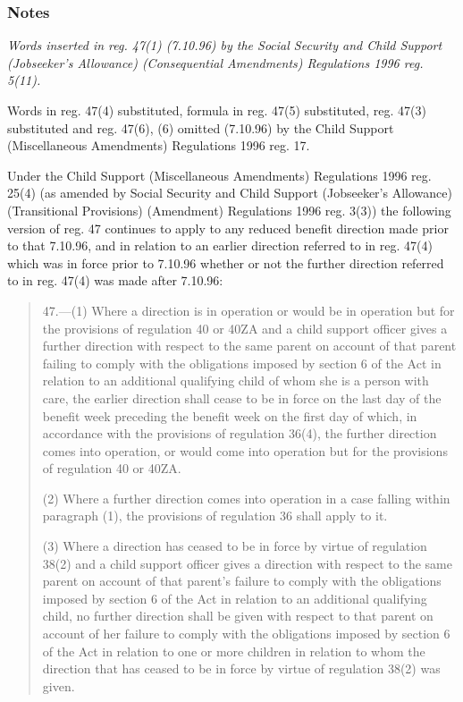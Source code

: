 \documentclass[a4paper]{article}
\newcommand\amendment[1]{\subsubsection*{Notes}{\itshape\frenchspacing\footnotesize #1 \par}}
\begin{document}
\amendment{
Words inserted in reg. 47(1) (7.10.96) by the Social Security and Child Support (Jobseeker's Allowance) (Consequential Amendments) Regulations 1996 reg. 5(11).

Words in reg. 47(4) substituted, formula in reg. 47(5) substituted, reg. 47(3) substituted and reg. 47(6), (6) omitted (7.10.96) by the Child Support (Miscellaneous Amendments) Regulations 1996 reg. 17.

Under the Child Support (Miscellaneous Amendments) Regulations 1996 reg. 25(4) (as amended by Social Security and Child Support (Jobseeker's Allowance) (Transitional Provisions) (Amendment) Regulations 1996 reg. 3(3)) the following version of reg. 47 continues to apply to any reduced benefit direction made prior to that 7.10.96, and in relation to an earlier direction referred to in reg. 47(4) which was in force prior to 7.10.96 whether or not the further direction referred to in reg. 47(4) was made after 7.10.96:

\begin{quotation}
47.—(1) Where a direction is in operation or would be in operation but for the provisions of regulation 40 
or 40ZA  %
and a child support officer gives a further direction with respect to the same parent on account of that parent failing to comply with the obligations imposed by section 6 of the Act in relation to an additional qualifying child of whom she is a person with care, the earlier direction shall cease to be in force on the last day of the benefit week preceding the benefit week on the first day of which, in accordance with the provisions of regulation 36(4), the further direction comes into operation, or would come into operation but for the provisions of regulation 40
or 40ZA.  %

(2) Where a further direction comes into operation in a case falling within paragraph (1), the provisions of regulation 36 shall apply to it.

(3) Where a direction has ceased to be in force by virtue of regulation 38(2) and a child support officer gives a direction with respect to the same parent on account of that parent’s failure to comply with the obligations imposed by section 6 of the Act in relation to an additional qualifying child, no further direction shall be given with respect to that parent on account of her failure to comply with the obligations imposed by section 6 of the Act in relation to one or more children in relation to whom the direction that has ceased to be in force by virtue of regulation 38(2) was given.


\end{quotation}}
\end{document}
